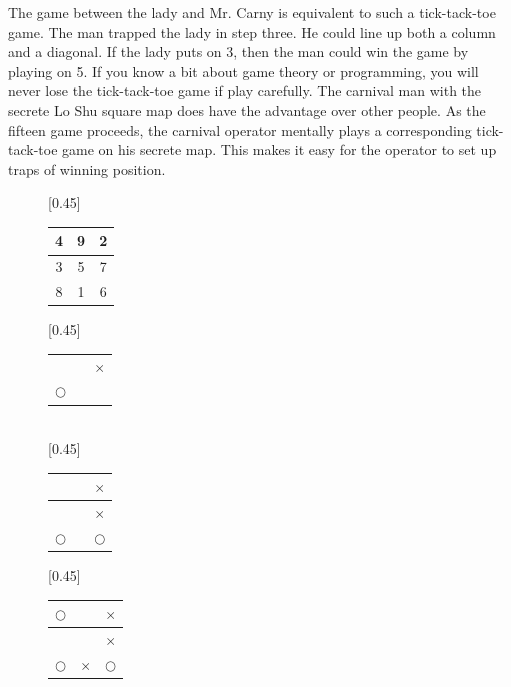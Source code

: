 \documentclass[UTF8]{article}
\begin{document}
The game between the lady and Mr. Carny is equivalent to such a tick-tack-toe game. The man trapped the lady in step three. He could line up both a column and a diagonal. If the lady puts on 3, then the man could win the game by playing on 5. If you know a bit about game theory or programming, you will never lose the tick-tack-toe game if play carefully. The carnival man with the secrete Lo Shu square map does have the advantage over other people. As the fifteen game proceeds, the carnival operator mentally plays a corresponding tick-tack-toe game on his secrete map. This makes it easy for the operator to set up traps of winning position.

\begin{figure}[htbp]
 \centering
 [0.45\linewidth]{
   \begin{tabular}{|c|c|c|}
   \hline
   4 & 9 & 2 \\
   \hline
   3 & 5 & 7 \\
   \hline
   8 & 1 & 6 \\
   \hline
   \end{tabular}
   \vspace{3mm}
 }
 [0.45\linewidth]{
   \begin{tabular}{c|c|c}
   &  & \\
   \hline
   &  & $\times$ \\
   \hline
   $\bigcirc$ & & \\
   \end{tabular}
   \vspace{3mm}
 } \vspace{3mm} \\
 [0.45\linewidth]{
   \begin{tabular}{c|c|c}
   &  & $\times$\\
   \hline
   &  & $\times$ \\
   \hline
   $\bigcirc$ & & $\bigcirc$ \\
   \end{tabular}
   \vspace{3mm}
 }
 [0.45\linewidth]{
   \begin{tabular}{c|c|c}
   $\bigcirc$ &  & $\times$\\
   \hline
   &  & $\times$ \\
   \hline
   $\bigcirc$ & $\times$ & $\bigcirc$ \\

\end{tabular}}
\end{figure}
\end{document}

